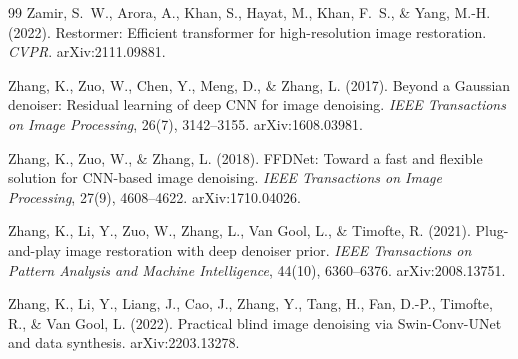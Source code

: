 \documentclass{article}
\begin{document}
\begin{thebibliography}{99}
Zamir, S.~W., Arora, A., Khan, S., Hayat, M., Khan, F.~S., \& Yang, M.-H. (2022).
\newblock Restormer: Efficient transformer for high-resolution image restoration.
\newblock \emph{CVPR}. arXiv:2111.09881.

Zhang, K., Zuo, W., Chen, Y., Meng, D., \& Zhang, L. (2017).
\newblock Beyond a Gaussian denoiser: Residual learning of deep CNN for image denoising.
\newblock \emph{IEEE Transactions on Image Processing}, 26(7), 3142--3155. arXiv:1608.03981.

Zhang, K., Zuo, W., \& Zhang, L. (2018).
\newblock FFDNet: Toward a fast and flexible solution for CNN-based image denoising.
\newblock \emph{IEEE Transactions on Image Processing}, 27(9), 4608--4622. arXiv:1710.04026.

Zhang, K., Li, Y., Zuo, W., Zhang, L., Van Gool, L., \& Timofte, R. (2021).
\newblock Plug-and-play image restoration with deep denoiser prior.
\newblock \emph{IEEE Transactions on Pattern Analysis and Machine Intelligence}, 44(10), 6360--6376. arXiv:2008.13751.

Zhang, K., Li, Y., Liang, J., Cao, J., Zhang, Y., Tang, H., Fan, D.-P., Timofte, R., \& Van Gool, L. (2022).
\newblock Practical blind image denoising via Swin-Conv-UNet and data synthesis.
\newblock arXiv:2203.13278.

\end{thebibliography}
\end{document}
